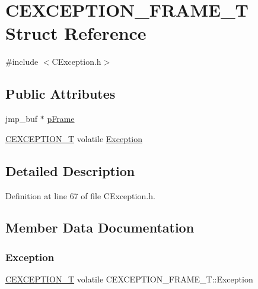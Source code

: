 \hypertarget{struct_c_e_x_c_e_p_t_i_o_n___f_r_a_m_e___t}{}\section{C\+E\+X\+C\+E\+P\+T\+I\+O\+N\+\_\+\+F\+R\+A\+M\+E\+\_\+T Struct Reference}
\label{struct_c_e_x_c_e_p_t_i_o_n___f_r_a_m_e___t}


{\ttfamily \#include $<$C\+Exception.\+h$>$}

\subsection*{Public Attributes}
\begin{DoxyCompactItemize}
\item 
jmp\+\_\+buf $\ast$ \hyperlink{struct_c_e_x_c_e_p_t_i_o_n___f_r_a_m_e___t_a6c0fa02df976ea39e7182a67a672efe1}{p\+Frame}
\item 
\hyperlink{_c_exception_8h_a22368ec67c1c48cc2348245f47a02aef}{C\+E\+X\+C\+E\+P\+T\+I\+O\+N\+\_\+T} volatile \hyperlink{struct_c_e_x_c_e_p_t_i_o_n___f_r_a_m_e___t_a06fa92ed863b4edce1dcb7033d8243a8}{Exception}
\end{DoxyCompactItemize}


\subsection{Detailed Description}


Definition at line 67 of file C\+Exception.\+h.



\subsection{Member Data Documentation}
\mbox{\label{struct_c_e_x_c_e_p_t_i_o_n___f_r_a_m_e___t_a06fa92ed863b4edce1dcb7033d8243a8}} 
\subsubsection{\texorpdfstring{Exception}{Exception}}
{\footnotesize\ttfamily \hyperlink{_c_exception_8h_a22368ec67c1c48cc2348245f47a02aef}{C\+E\+X\+C\+E\+P\+T\+I\+O\+N\+\_\+T} volatile C\+E\+X\+C\+E\+P\+T\+I\+O\+N\+\_\+\+F\+R\+A\+M\+E\+\_\+\+T\+::\+Exception}



